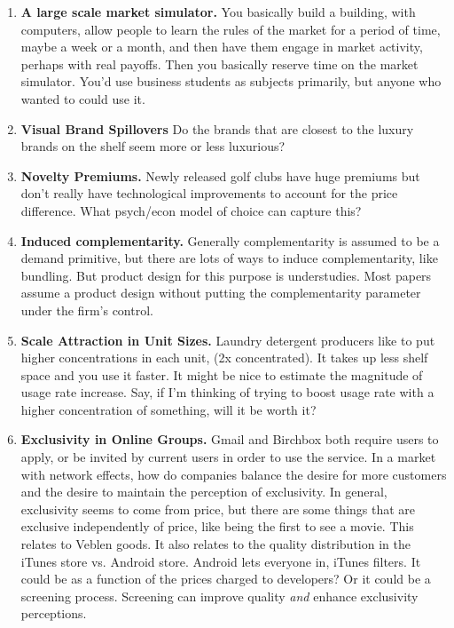 \documentclass[paper=a4, fontsize=11pt]{scrartcl} %
\numberwithin{equation}{section} %
\numberwithin{figure}{section} %
\numberwithin{table}{section} %
\begin{document}
\begin{enumerate}
\item \textbf{A large scale market simulator.}  You basically build a building, with computers, allow people to learn the rules of the market for a period of time, maybe a week or a month, and then have them engage in market activity, perhaps with real payoffs.  Then you basically reserve time on the market simulator.  You'd use business students as subjects primarily, but anyone who wanted to could use it.

\item \textbf{Visual Brand Spillovers}  Do the brands that are closest to the luxury brands on the shelf seem more or less luxurious?

\item \textbf{Novelty Premiums.}  Newly released golf clubs have huge premiums but don't really have technological improvements to account for the price difference.  What psych/econ model of choice can capture this?  
   
\item \textbf{Induced complementarity.}  Generally complementarity is assumed to be a demand primitive, but there are lots of ways to induce complementarity, like bundling.  But product design for this purpose is understudies.  Most papers assume a product design without putting the complementarity parameter under the firm's control.

\item \textbf{Scale Attraction in Unit Sizes.}  Laundry detergent producers like to put higher concentrations in each unit, (2x concentrated).  It takes up less shelf space and you use it faster.  It might be nice to estimate the magnitude of usage rate increase.  Say, if I'm thinking of trying to boost usage rate with a higher concentration of something, will it be worth it?  

\item \textbf{Exclusivity in Online Groups.}  Gmail and Birchbox both require users to apply, or be invited by current users in order to use the service.  In a market with network effects, how do companies balance the desire for more customers and the desire to maintain the perception of exclusivity.  In general, exclusivity seems to come from price, but there are some things that are exclusive independently of price, like being the first to see a movie.  This relates to Veblen goods.  It also relates to the quality distribution in the iTunes store vs. Android store.  Android lets everyone in, iTunes filters.  It could be as a function of the prices charged to developers?  Or it could be a screening process.  Screening can improve quality \textit{and} enhance exclusivity perceptions. 


\end{enumerate}
\end{document}
